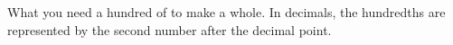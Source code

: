 What you need a hundred of to make a whole.
In decimals, the hundredths are represented by the second number
after the decimal point.